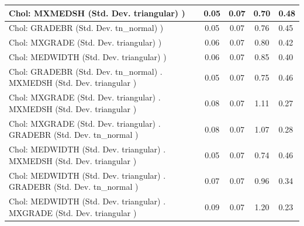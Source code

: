 \begin{table}
\begin{center}
\begin{tabular}{|l|l|c|c|c|l|}
			\hline
			 Chol: MXMEDSH (Std. Dev. triangular) ) &  & 0.05 & 0.07 & 0.70 & 0.48 \\
			\hline
			 Chol: GRADEBR (Std. Dev. tn_normal) ) &  & 0.05 & 0.07 & 0.76 & 0.45 \\
			\hline
			 Chol: MXGRADE (Std. Dev. triangular) ) &  & 0.06 & 0.07 & 0.80 & 0.42 \\
			\hline
			 Chol: MEDWIDTH (Std. Dev. triangular) ) &  & 0.06 & 0.07 & 0.85 & 0.40 \\
			\hline
			 Chol: GRADEBR (Std. Dev. tn_normal) . MXMEDSH (Std. Dev.   triangular ) &  & 0.05 & 0.07 & 0.75 & 0.46 \\
			\hline
			 Chol: MXGRADE (Std. Dev. triangular) . MXMEDSH (Std. Dev.   triangular ) &  & 0.08 & 0.07 & 1.11 & 0.27 \\
			\hline
			 Chol: MXGRADE (Std. Dev. triangular) . GRADEBR (Std. Dev.   tn_normal ) &  & 0.08 & 0.07 & 1.07 & 0.28 \\
			\hline
			 Chol: MEDWIDTH (Std. Dev. triangular) . MXMEDSH (Std. Dev.   triangular ) &  & 0.05 & 0.07 & 0.74 & 0.46 \\
			\hline
			 Chol: MEDWIDTH (Std. Dev. triangular) . GRADEBR (Std. Dev.   tn_normal ) &  & 0.07 & 0.07 & 0.96 & 0.34 \\
			\hline
			 Chol: MEDWIDTH (Std. Dev. triangular) . MXGRADE (Std. Dev.   triangular ) &  & 0.09 & 0.07 & 1.20 & 0.23 \\
			\hline
		\end{tabular}
	\end{center}
\end{table}